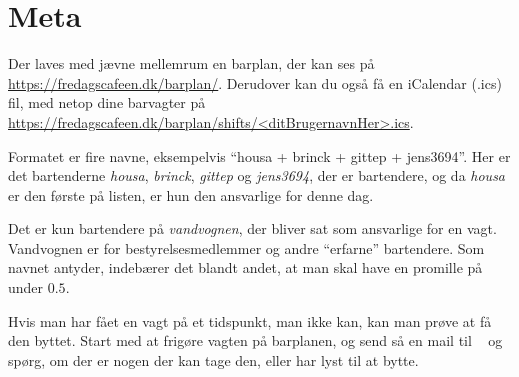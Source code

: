 \section{Meta}
\label{sec:meta}

Der laves med jævne mellemrum en barplan, der kan ses på
\url{https://fredagscafeen.dk/barplan/}. Derudover kan du også få en
iCalendar (.ics) fil, med netop dine barvagter på
\url{https://fredagscafeen.dk/barplan/shifts/<ditBrugernavnHer>.ics}.

Formatet er fire navne, eksempelvis ``housa + brinck +
gittep + jens3694''. Her er det bartenderne \emph{housa},
\emph{brinck}, \emph{gittep} og \emph{jens3694}, der er bartendere, og
da \emph{housa} er den første på listen, er hun den ansvarlige for
denne dag.

Det er kun bartendere på \emph{vandvognen}, der bliver sat som
ansvarlige for en vagt. Vandvognen er for bestyrelsesmedlemmer
og andre ``erfarne'' bartendere. Som navnet antyder, indebærer det
blandt andet, at man skal have en promille på under $0.5$. 

Hvis man har fået en vagt på et tidspunkt, man ikke kan, kan man prøve
at få den byttet. Start med at frigøre vagten på barplanen, 
og send så en mail til \allemail~ og
spørg, om der er nogen der kan tage den, eller har lyst til at bytte.

